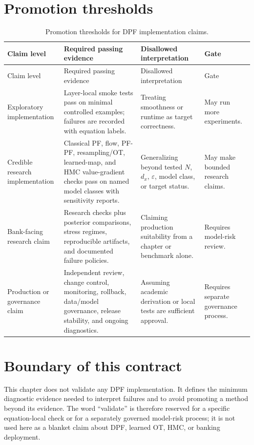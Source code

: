 \section{Promotion thresholds}
\label{sec:bf-dpf-debug-promotion-thresholds}

\begin{longtable}{@{}p{} p{} p{} p{}@{}}
\caption{Promotion thresholds for DPF implementation claims.}
\label{tab:bf-dpf-debug-promotion-thresholds}\\
\toprule
Claim level & Required passing evidence & Disallowed interpretation & Gate \\
\midrule
\endfirsthead
\toprule
Claim level & Required passing evidence & Disallowed interpretation & Gate \\
\midrule
\endhead
Exploratory implementation &
Layer-local smoke tests pass on minimal controlled examples; failures are
recorded with equation labels. &
Treating smoothness or runtime as target correctness. &
May run more experiments. \\
Credible research implementation &
Classical PF, flow, PF-PF, resampling/OT, learned-map, and HMC value-gradient
checks pass on named model classes with sensitivity reports. &
Generalizing beyond tested $N$, $d_x$, $\varepsilon$, model class, or target
status. &
May make bounded research claims. \\
Bank-facing research claim &
Research checks plus posterior comparisons, stress regimes, reproducible
artifacts, and documented failure policies. &
Claiming production suitability from a chapter or benchmark alone. &
Requires model-risk review. \\
Production or governance claim &
Independent review, change control, monitoring, rollback, data/model
governance, release stability, and ongoing diagnostics. &
Assuming academic derivation or local tests are sufficient approval. &
Requires separate governance process. \\
\bottomrule
\end{longtable}

\section{Boundary of this contract}
\label{sec:bf-dpf-debug-boundary}

This chapter does not validate any DPF implementation.  It defines the
minimum diagnostic evidence needed to interpret failures and to avoid promoting
a method beyond its evidence.  The word ``validate'' is therefore reserved for a
specific equation-local check or for a separately governed model-risk process;
it is not used here as a blanket claim about DPF, learned OT, HMC, or banking
deployment.

\FloatBarrier

